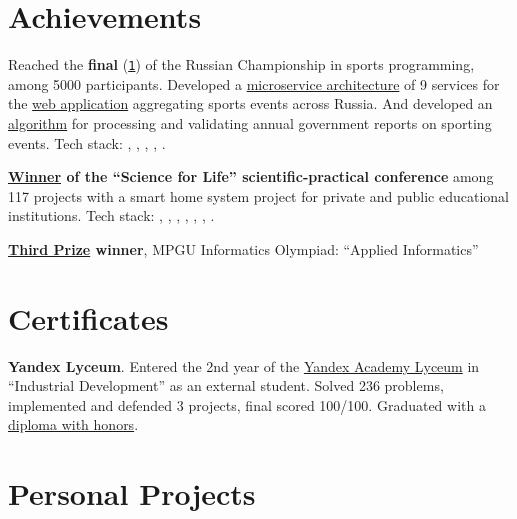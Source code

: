 \documentclass[margin,line]{resume}
\begin{document}
\begin{resume}
  \section{\mysidestyle Achievements}
  Reached the \textbf{final}
  (\href{https://alchemmist.github.io/CV/attachments/russian-chemp-final.pdf}{\texttt{1}})
  of the Russian Championship
  in sports programming, among 5000 participants. Developed a
  \href{https://alchemmist.github.io/CV/attachments/architect.pdf}{microservice architecture}
  of 9 services for the
  \href{https://github.com/alchemmist/sportprog}{web application}
  aggregating sports events across Russia. And developed an
  \href{https://github.com/alchemmist/sport-afisha/blob/main/event_parsing_service/parse_pdf.py}{algorithm}
  for processing and validating annual government reports on sporting events.
  Tech stack: , ,
  ,
  ,
  .

  \textbf{\href{https://alchemmist.github.io/CV/attachments/scince-for-life-win.pdf}{Winner}
  of the “Science for Life” scientific-practical conference}
  among 117 projects with a smart home system project for private and public
  educational institutions. Tech stack: ,
  , , ,
  , , .

  \textbf{\href{https://alchemmist.github.io/CV/attachments/informatics-olimpic.pdf}{Third Prize}
  winner}, MPGU Informatics Olympiad:
  “Applied Informatics”

  \section{\mysidestyle Certificates}
  \textbf{Yandex Lyceum}. Entered the 2nd year of the
  \href{https://lyceum.yandex.ru/}{Yandex Academy Lyceum}
  in “Industrial Development” as an external student. Solved 236 problems,
  implemented and defended 3 projects, final scored 100/100. Graduated with
  a \href{https://alchemmist.github.io/CV/attachments/yandex-lyceum.pdf}{diploma with honors}.

  \section{\mysidestyle Personal Projects}\vspace{2mm}

  \begin{description}


\end{description}
\end{resume}
\end{document}
